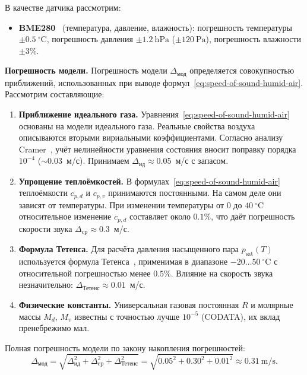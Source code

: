 В качестве датчика рассмотрим:
\begin{itemize}
    \item \textbf{BME280}~\cite{bme280} (температура, давление, влажность): погрешность температуры $\pm 0.5\ ^\circ\mathrm{C}$, погрешность давления $\pm 1.2\ \mathrm{hPa}$ ($\pm 120\ \mathrm{Pa}$), погрешность влажности $\pm 3\%$.
\end{itemize}

\textbf{Погрешность модели.}
Погрешность модели $\Delta_{\text{мод}}$ определяется совокупностью приближений, использованных при выводе формул~\eqref{eq:speed-of-sound-humid-air}. Рассмотрим составляющие:

\begin{enumerate}
    \item \textbf{Приближение идеального газа.} Уравнения~\eqref{eq:speed-of-sound-humid-air} основаны на модели идеального газа.
    Реальные свойства воздуха описываются вторыми вириальными коэффициентами. Согласно анализу Cramer~\cite{cramer1993},
    учёт нелинейности уравнения состояния вносит поправку порядка $10^{-4}$ ($\sim 0.03$~м/с). Принимаем $\Delta_{\text{ид}} \approx 0.05$~м/с с запасом.

    \item \textbf{Упрощение теплоёмкостей.} В формулах~\eqref{eq:speed-of-sound-humid-air} теплоёмкости $c_{p,d}$ и $c_{p,v}$
    принимаются постоянными. На самом деле они зависят от температуры. При изменении температуры от 0 до $40\ ^\circ\mathrm{C}$
    относительное изменение $c_{p,d}$ составляет около $0.1\%$, что даёт погрешность скорости звука $\Delta_{\text{cp}} \approx 0.3$~м/с.

    \item \textbf{Формула Тетенса.} Для расчёта давления насыщенного пара $p_{\mathrm{sat}}(T)$ используется формула Тетенса~\cite{buck1981},
    применимая в диапазоне $-20\ldots 50\ ^\circ\mathrm{C}$ с относительной погрешностью менее $0.5\%$.
    Влияние на скорость звука незначительно: $\Delta_{\text{Тетенс}} \approx 0.01$~м/с.

    \item \textbf{Физические константы.} Универсальная газовая постоянная $R$ и молярные массы $M_d$, $M_v$ известны
    с точностью лучше $10^{-5}$ (CODATA), их вклад пренебрежимо мал.
\end{enumerate}

Полная погрешность модели по закону накопления погрешностей:
\begin{equation}\label{eq:model-error}
    \Delta_{\text{мод}} = \sqrt{\Delta_{\text{ид}}^2 + \Delta_{\text{cp}}^2 + \Delta_{\text{Тетенс}}^2} = \sqrt{0.05^2 + 0.30^2 + 0.01^2} \approx 0.31\ \mathrm{m/s}.
\end{equation}

